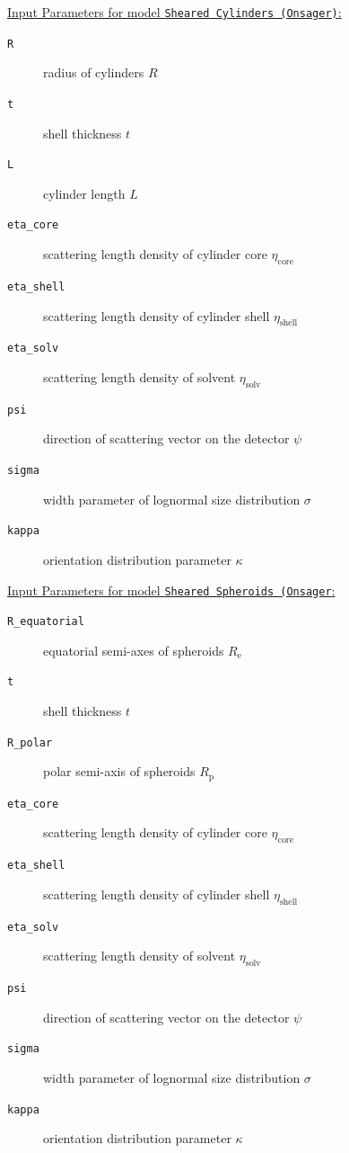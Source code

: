 \vspace{5mm}

\uline{Input Parameters for model \texttt{Sheared Cylinders (Onsager)}:}\\
\begin{description}
\item[\texttt{R}] radius of cylinders $R$
\item[\texttt{t}] shell thickness $t$
\item[\texttt{L}] cylinder length $L$
\item[\texttt{eta\_core}] scattering length density of cylinder core $\eta_\mathrm{core}$
\item[\texttt{eta\_shell}] scattering length density of cylinder shell $\eta_\mathrm{shell}$
\item[\texttt{eta\_solv}] scattering length density of solvent $\eta_\mathrm{solv}$
\item[\texttt{psi}] direction of scattering vector on the detector $\psi$
\item[{\texttt{sigma}}] width parameter of lognormal size distribution $\sigma$
\item[{\texttt{kappa}}] orientation distribution parameter $\kappa$
\end{description}

\vspace{5mm}

\uline{Input Parameters for model \texttt{Sheared Spheroids (Onsager}:}\\
\begin{description}
\item[\texttt{R\_equatorial}] equatorial semi-axes of spheroids $R_\mathrm{e}$
\item[\texttt{t}] shell thickness $t$
\item[\texttt{R\_polar}] polar semi-axis of spheroids $R_\mathrm{p}$
\item[\texttt{eta\_core}] scattering length density of cylinder core $\eta_\mathrm{core}$
\item[\texttt{eta\_shell}] scattering length density of cylinder shell $\eta_\mathrm{shell}$
\item[\texttt{eta\_solv}] scattering length density of solvent $\eta_\mathrm{solv}$
\item[\texttt{psi}] direction of scattering vector on the detector $\psi$
\item[{\texttt{sigma}}] width parameter of lognormal size distribution $\sigma$
\item[{\texttt{kappa}}] orientation distribution parameter $\kappa$
\end{description}

